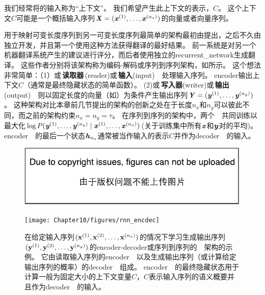 我们经常将的输入称为``上下文''。
我们希望产生此上下文的表示，$C$。
这个上下文$C$可能是一个概括输入序列$\boldsymbol{\mathit{X}}=(\boldsymbol{\mathit{x}}^{(1)},\dots,\boldsymbol{\mathit{x}}^{(n_x)})$的向量或者向量序列。

用于映射可变长度序列到另一可变长度序列最简单的架构最初由\cite{cho-al-emnlp14}提出，之后不久由\cite{Sutskever-et-al-NIPS2014}独立开发，并且第一个使用这种方法获得翻译的最好结果。
前一系统是对另一个机器翻译系统产生的建议进行评分，而后者使用独立的\gls{recurrent_network}生成翻译。
这些作者分别将该架构称为编码-解码或序列到序列架构，如所示。
这个想法非常简单：（1）或\,\textbf{读取器}\,(reader)或\,\textbf{输入}(input)~~处理输入序列。
\gls{encoder}输出上下文$C$（通常是最终隐藏状态的简单函数）。
(2)或\,\textbf{写入器}(writer)或\,\textbf{输出}(output)~~则以固定长度的向量（如）为条件产生输出序列$\boldsymbol{\mathit{Y}}=(\boldsymbol{\mathit{y}}^{(1)}, \dots, \boldsymbol{\mathit{y}}^{(n_y)})$。
这种架构对比本章前几节提出的架构的创新之处在于长度$n_x$和$n_y$可以彼此不同，而之前的架构约束$n_x = n_y = \tau$。
在序列到序列的架构中，两个~~共同训练以最大化$\log P( \boldsymbol{\mathit{y}}^{(1)}, \dots, \boldsymbol{\mathit{y}}^{(n_y)} \mid \boldsymbol{\mathit{x}}^{(1)},\dots,\boldsymbol{\mathit{x}}^{(n_x)} )$(关于训练集中所有$\boldsymbol{\mathit{x}}$和$\boldsymbol{\mathit{y}}$对的平均)。
\gls{encoder}~~的最后一个状态$\boldsymbol{\mathit{h}}_{n_x}$通常被当作输入的表示$C$并作为\gls{decoder}~~的输入。

\begin{figure}[!htb]
\ifOpenSource
\centerline{\includegraphics{figure.pdf}}
\else
\centerline{\texttt{[image: Chapter10/figures/rnn\_encdec]}}
\fi
\caption{在给定输入序列$(\mathbf{x}^{(1)},\mathbf{x}^{(2)},\dots,\mathbf{x}^{(n_x)})$的情况下学习生成输出序列$(\mathbf{y}^{(1)},\mathbf{y}^{(2)},\dots,\mathbf{y}^{(n_y)})$的\gls{encoder}-\gls{decoder}或序列到序列的~~架构的示例。 
它由读取输入序列的\gls{encoder}~~以及生成输出序列（或计算给定输出序列的概率）的\gls{decoder}~~组成。
\gls{encoder}~~的最终隐藏状态用于计算一般为固定大小的上下文变量$C$，$C$表示输入序列的语义概要并且作为\gls{decoder}~~的输入。
}
\label{fig:chap10_rnn_encdec}
\end{figure}

